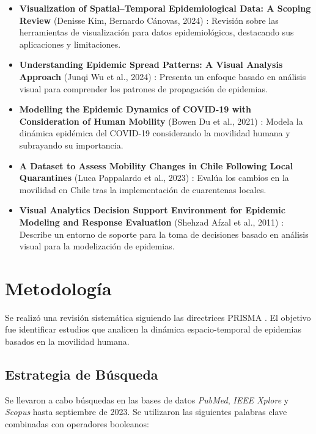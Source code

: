 \documentclass[sigconf]{acmart}
\begin{document}
\begin{itemize}
    \item \textbf{Visualization of Spatial–Temporal Epidemiological Data: A Scoping Review} (Denisse Kim, Bernardo Cánovas, 2024) \cite{kim2024scoping}: Revisión sobre las herramientas de visualización para datos epidemiológicos, destacando sus aplicaciones y limitaciones.

    \item \textbf{Understanding Epidemic Spread Patterns: A Visual Analysis Approach} (Junqi Wu et al., 2024) \cite{wu2024patterns}: Presenta un enfoque basado en análisis visual para comprender los patrones de propagación de epidemias.

    \item \textbf{Modelling the Epidemic Dynamics of COVID-19 with Consideration of Human Mobility} (Bowen Du et al., 2021) \cite{du2021dynamics}: Modela la dinámica epidémica del COVID-19 considerando la movilidad humana y subrayando su importancia.

    \item \textbf{A Dataset to Assess Mobility Changes in Chile Following Local Quarantines} (Luca Pappalardo et al., 2023) \cite{pappalardo2023dataset}: Evalúa los cambios en la movilidad en Chile tras la implementación de cuarentenas locales.

    \item \textbf{Visual Analytics Decision Support Environment for Epidemic Modeling and Response Evaluation} (Shehzad Afzal et al., 2011) \cite{afzal2011visual}: Describe un entorno de soporte para la toma de decisiones basado en análisis visual para la modelización de epidemias.
\end{itemize}

\section{Metodología}
Se realizó una revisión sistemática siguiendo las directrices PRISMA \cite{prisma2009}. El objetivo fue identificar estudios que analicen la dinámica espacio-temporal de epidemias basados en la movilidad humana.

\subsection{Estrategia de Búsqueda}

Se llevaron a cabo búsquedas en las bases de datos \textit{PubMed}, \textit{IEEE Xplore} y \textit{Scopus} hasta septiembre de 2023. Se utilizaron las siguientes palabras clave combinadas con operadores booleanos:
\end{document}
